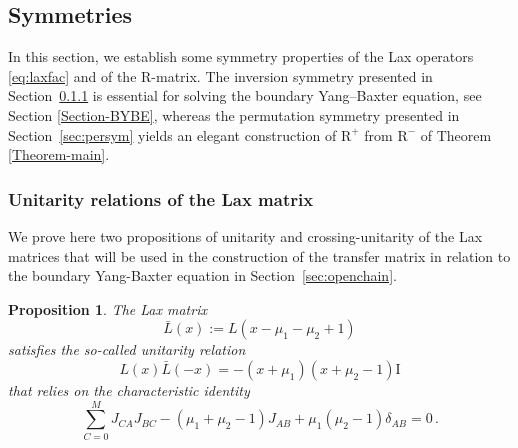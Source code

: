 \documentclass[11pt]{article}
\numberwithin{equation}{section}
\newtheorem{proposition}[theorem]{Proposition}
\newcommand{\M}{M}
\newcommand{\ID}{\mathrm{I}}
\newcommand{\abrOSCR}{\mathrm{R}}
\begin{document}
\subsection{Symmetries}
In this section, we establish some symmetry properties of the Lax operators \eqref{eq:laxfac} and of the R-matrix. The inversion symmetry presented in Section~\ref{sec:inL} is essential for solving the boundary Yang–Baxter equation, see Section \ref{Section-BYBE}, whereas the permutation symmetry presented in Section~\ref{sec:persym} yields an elegant construction of $\abrOSCR^{+}$ from $\abrOSCR^{-}$ of Theorem \ref{Theorem-main}.


\subsubsection{Unitarity relations of the Lax matrix}\label{sec:inL}
We prove here two propositions of unitarity and crossing-unitarity of the Lax matrices that will be used in the construction of the transfer matrix in relation to the boundary Yang-Baxter equation in Section~\ref{sec:openchain}.
\begin{proposition}\label{prop:Lbar}
The Lax matrix
	\begin{equation}\label{L-bar-definition}
		\bar L(x):=L(x-\mu_1-\mu_2+1)
	\end{equation}
satisfies the so-called unitarity relation 
	\begin{equation}
		L(x)\bar L(-x)=-(x+\mu_1)(x+\mu_2-1)\ID
	\end{equation}
    that relies on the characteristic identity 
    \begin{equation}\label{eq:genrec}
       \sum_{C=0}^{\M} J_{CA}J_{BC}-(\mu_1+\mu_2-1)J_{AB}+\mu_1(\mu_2-1)\delta_{AB}=0\,.
    \end{equation}
\end{proposition}
\end{document}
